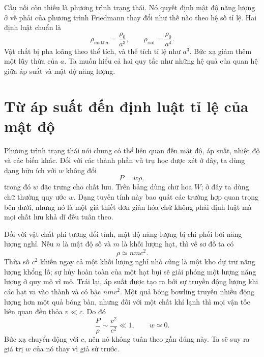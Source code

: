 Cầu nối còn thiếu là phương trình trạng thái. Nó quyết định mật độ năng lượng ở vế phải của phương trình Friedmann thay đổi như thế nào theo hệ số tỉ lệ. Hai định luật chuẩn là
\begin{equation}
\rho_{\text{matter}}=\frac{\rho_0}{a^3},
\qquad
\rho_{\text{rad}}=\frac{\rho_0}{a^4}.
\label{eq:c05-benchmark-densities}
\end{equation}
Vật chất bị pha loãng theo thể tích, và thể tích tỉ lệ như \(a^3\). Bức xạ giảm thêm một lũy thừa của \(a\). Ta muốn hiểu cả hai quy tắc như những hệ quả của quan hệ giữa áp suất và mật độ năng lượng.

\section{Từ áp suất đến định luật tỉ lệ của mật độ}

Phương trình trạng thái nói chung có thể liên quan đến mật độ, áp suất, nhiệt độ và các biến khác. Đối với các thành phần vũ trụ học được xét ở đây, ta dùng dạng hữu ích với \(w\) không đổi
\begin{equation}
P=w\rho,
\label{eq:c05-eos}
\end{equation}
trong đó \(w\) đặc trưng cho chất lưu. Trên bảng dùng chữ hoa \(W\); ở đây ta dùng chữ thường quy ước \(w\). Dạng tuyến tính này bao quát các trường hợp quan trọng bên dưới, nhưng nó là một giả thiết đơn giản hóa chứ không phải định luật mà mọi chất lưu khả dĩ đều tuân theo.

Đối với vật chất phi tương đối tính, mật độ năng lượng bị chi phối bởi năng lượng nghỉ. Nếu \(n\) là mật độ số và \(m\) là khối lượng hạt, thì về sơ đồ ta có
\begin{equation}
\rho\simeq nmc^2.
\end{equation}
Thừa số \(c^2\) khiến ngay cả một khối lượng nghỉ nhỏ cũng là một kho dự trữ năng lượng khổng lồ; sự hủy hoàn toàn của một hạt bụi sẽ giải phóng một lượng năng lượng ở quy mô vĩ mô. Trái lại, áp suất được tạo ra bởi sự truyền động lượng khi các hạt va vào thành và có bậc \(nmv^2\). Một quả bóng bowling truyền nhiều động lượng hơn một quả bóng bàn, nhưng đối với một chất khí lạnh thì mọi vận tốc liên quan đều thỏa \(v\ll c\). Do đó
\begin{equation}
\frac{P}{\rho}\sim\frac{v^2}{c^2}\ll1,
\qquad
w\simeq0.
\label{eq:c05-dust-eos}
\end{equation}
Bức xạ chuyển động với \(c\), nên nó không tuân theo gần đúng này. Ta sẽ suy ra giá trị \(w\) của nó thay vì giả sử trước.

